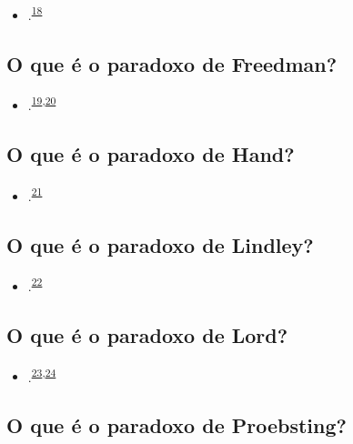 \documentclass[
  a4paper,
]{book}
\providecommand{\tightlist}{%
  \setlength{\itemsep}{0pt}\setlength{\parskip}{0pt}}
\begin{document}
\begin{itemize}
\tightlist
\item
  .\textsuperscript{\protect\hyperlink{ref-ellsberg1961}{18}}
\end{itemize}

\hypertarget{freedman}{%
\subsection{O que é o paradoxo de Freedman?}\label{freedman}}

\begin{itemize}
\tightlist
\item
  .\textsuperscript{\protect\hyperlink{ref-freedman1983}{19},\protect\hyperlink{ref-freedman1989}{20}}
\end{itemize}

\hypertarget{hand}{%
\subsection{O que é o paradoxo de Hand?}\label{hand}}

\begin{itemize}
\tightlist
\item
  .\textsuperscript{\protect\hyperlink{ref-hand1992}{21}}
\end{itemize}

\hypertarget{lindley}{%
\subsection{O que é o paradoxo de Lindley?}\label{lindley}}

\begin{itemize}
\tightlist
\item
  .\textsuperscript{\protect\hyperlink{ref-lindley1957}{22}}
\end{itemize}

\hypertarget{lord}{%
\subsection{O que é o paradoxo de Lord?}\label{lord}}

\begin{itemize}
\tightlist
\item
  .\textsuperscript{\protect\hyperlink{ref-lord1967}{23},\protect\hyperlink{ref-lord1969}{24}}
\end{itemize}

\hypertarget{proebsting}{%
\subsection{O que é o paradoxo de Proebsting?}\label{proebsting}}
\end{document}
